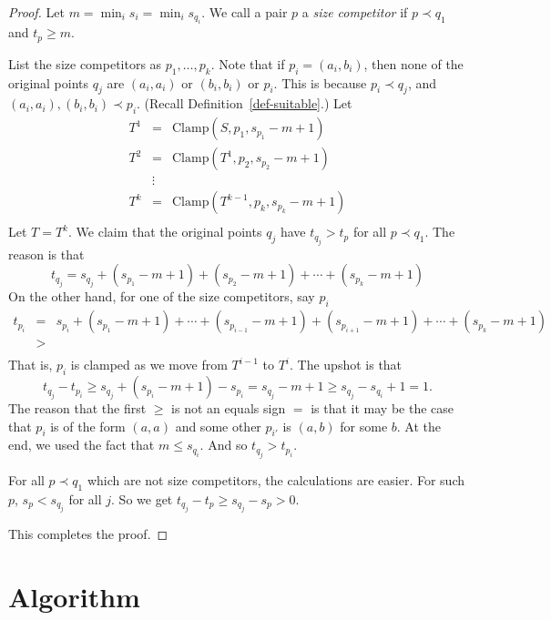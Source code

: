 \documentclass[12pt]{article}
\theoremstyle{definition}
\newcommand{\Update}{\mbox{Clamp}}
\begin{document}
 \begin{proof}
 Let $m =  \min_i s_{i} = \min_i s_{q_i}$.
We call a pair $p$ a \emph{size competitor} if 
$p\prec q_1$ and $t_p \geq m$.
 
List the size competitors as $p_1, \ldots, p_k$. 
 Note that if $p_i = (a_i,b_i)$, then none of the original
 points $q_j$ are $(a_i,a_i)$ or $(b_i,b_i)$
or $p_i$.   This
is because $p_i \prec q_j$, and 
$(a_i,a_i), (b_i,b_i) \prec p_i$.
(Recall Definition~\ref{def-suitable}.)
 Let \[ \begin{array}{lcl}
 T^1  & = &  \Update(S,p_1,  s_{p_1} -m + 1)\\

T^2 & = & \Update(T^1,p_2,  s_{p_2}-m + 1 )\\
  & \vdots   & \\
T^{k} & = & \Update(T^{k-1},p_k, s_{p_k}-m + 1 )\\
\end{array}
\]
Let $T = T^{k}$.
We claim that the original points $q_j$ have $t_{q_j} > t_{p}$
for all $p \prec q_1$.
The reason is that 
\[ t_{q_j} = s_{q_j} + ( s_{p_1} -m + 1) + (s_{p_2}-m + 1) + \cdots 
+ ( s_{p_k} -m + 1)
\]
On the other hand, for one of the size competitors, say $p_i$
\[\begin{array}{lcl}
t_{p_i} & = & s_{p_i} + ( s_{p_1}-m  + 1) + \cdots +
(s_{p_{i-1}} -m  + 1)
+ (s_{p_{i+1}} -m  + 1) + \cdots +(s_{p_k}-m + 1)\\
& > &  \\
\end{array}
\]
That is, $p_i$ is clamped as we move from $T^{i-1}$ to $T^i$.
The upshot is that \[t_{q_j} - t_{p_i} \geq s_{q_j} + (s_{p_i}-m + 1)  -
s_{p_i} = s_{q_j} - m + 1
\geq  s_{q_j} -s_{q_i} +1  = 1.\]
The reason that the first $\geq$ is not an equals sign $=$
is that it may be the case that $p_i$ is of the form $(a,a)$
and some other $p_{i'}$ is $(a,b)$ for some $b$.
At the end, we used the fact that $m \leq s_{q_i}$.
And so $t_{q_j} > t_{p_i}$.


For all $p \prec q_1$ which are not  size competitors,
the calculations are easier.  For such $p$,
$s_p < s_{q_j}$ for all $j$.
So we get 
$t_{q_j} - t_{p} \geq s_{q_j} - s_{p} > 0$.

This completes the proof.
\end{proof}


\section{Algorithm}
\end{document}
